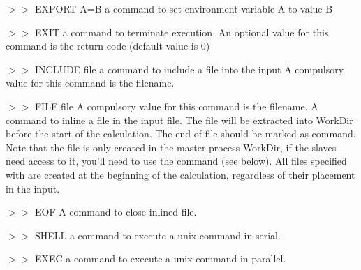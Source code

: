 \begin{commandlist}
\item[$>>$ EXPORT A=B ]  a command to set environment variable A to value B
\item[$>>$ EXIT ]  a command to terminate execution.
An optional value for this command is the return code (default value is 0)

\item[$>>$ INCLUDE file ]  a command to include a file into the input
A compulsory value for this command is the filename.
\item[$>>$ FILE file ]
A compulsory value for this command is the filename. A command to inline a
file in the input file. The file will be extracted into WorkDir before the
start of the calculation. The end of file should be marked as  command.
Note that the file is only created in the master process WorkDir, if the slaves
need access to it, you'll need to use the  command (see below).
All files specified with  are created at the beginning of the calculation,
regardless of their placement in the input.
\item[$>>$ EOF ]
A command to close inlined file.
\item[$>>$ SHELL ]  a command to execute a unix command in serial.
\item[$>>$ EXEC ]  a command to execute a unix command in parallel.



\end{commandlist}

